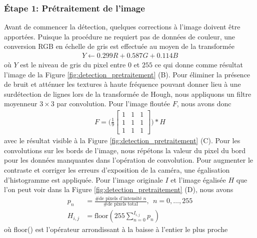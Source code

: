 \subsubsection{Étape 1: Prétraitement de l'image} Avant de commencer la détection, quelques corrections à l'image doivent être apportées. Puisque la procédure ne requiert pas de données de couleur, une conversion RGB en échelle de gris est effectuée au moyen de la transformée
\begin{align}
 Y \leftarrow 0.299 R + 0.587 G + 0.114 B
 \label{eq:rgb2gray}
\end{align}
où $Y$ est le niveau de gris du pixel entre $0$ et $255$ ce qui donne comme résultat l'image de la Figure \ref{fig:detection_pretraitement} (B). Pour éliminer la présence de bruit et atténuer les textures à haute fréquence pouvant donner lieu à une surdétection de lignes lors de la transformée de Hough, nous appliquons un filtre moyenneur $3 \times 3$ par convolution. Pour l'image floutée $F$, nous avons donc
\begin{align}
  F = \Bigg(\frac{1}{9}
    \begin{bmatrix}
      1 & 1 & 1\\
      1 & 1 & 1\\
      1 & 1 & 1
    \end{bmatrix}
  \Bigg) * H
  \label{eq:boxfilter}
\end{align}
avec le résultat visible à la Figure \ref{fig:detection_pretraitement} (C). Pour les convolutions sur les bords de l'image, nous répétons la valeur du pixel du bord pour les données manquantes dans l'opération de convolution. Pour augmenter le contraste et corriger les erreurs d'exposition de la caméra, une égalisation d'histogramme est appliquée. Pour l'image originale $I$ et l'image égalisée $H$ que l'on peut voir dans la Figure \ref{fig:detection_pretraitement} (D), nous avons
\begin{align}
  p_n &= \frac{\text{\# de pixels d'intensité } n }{\text{\# de pixels total}}, \ \ n = 0, \ldots, 255 \\
  H_{i,j} &= \text{floor}(255 \sum_{n=0}^{I_{i,j}} p_n)
  \label{eq:egalisation_histogramme}
\end{align}
où floor() est l'opérateur arrondissant à la baisse à l'entier le plus proche
